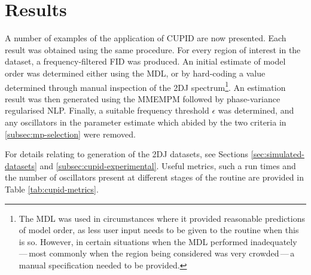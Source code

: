 \section{Results}
\label{subsec:cupid-results}
A number of examples of the application of \ac{CUPID} are now presented.
Each result was obtained using the same procedure. For every region of interest
in the dataset, a frequency-filtered \ac{FID} was produced. An initial estimate
of model order was determined either using the \ac{MDL}, or by hard-coding a
value determined through manual inspection of the \ac{2DJ} spectrum\footnote{
    The \ac{MDL} was used in circumstances where it provided reasonable
    predictions of model order, as less user input needs to be given to the
    routine when this is so. However, in certain situations when the \ac{MDL}
    performed inadequately\,---\,most commonly when the
    region being considered was very crowded\,---\,a manual specification
    needed to be provided.
}.
An estimation result was then generated using the \ac{MMEMPM} followed by
phase-variance regularised \ac{NLP}. Finally, a suitable frequency threshold
$\epsilon$ was determined, and any oscillators in the parameter estimate which
abided by the two criteria in \ref{subsec:mp-selection} were removed.

For details relating to generation of the \ac{2DJ} datasets, see Sections
\ref{sec:simulated-datasets} and \ref{subsec:cupid-experimental}. Useful
metrics, such a run times and the number of oscillators present at different
stages of the routine are provided in Table \ref{tab:cupid-metrics}.

